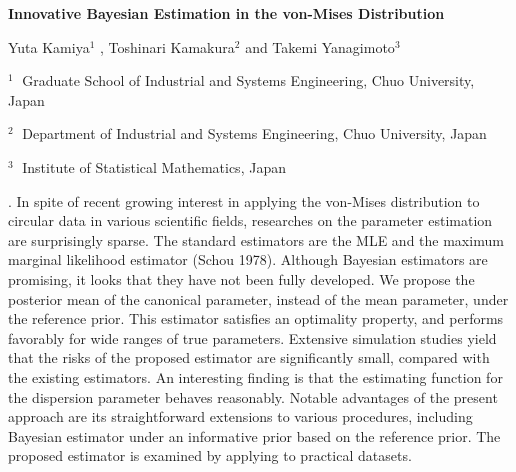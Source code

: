 \documentclass[12pt]{article}
\begin{document}
\begin{flushleft}


{\LARGE\bf Innovative Bayesian Estimation in the von-Mises Distribution}


\vspace{1.0cm}

Yuta Kamiya$^1$ , Toshinari Kamakura$^2$ and Takemi Yanagimoto$^3$

\begin{description}

\item $^1 \;$ Graduate School of Industrial and  Systems Engineering, Chuo University,
Japan
\vspace{-3mm}
\item $^2 \;$ Department of Industrial  and Systems Engineering, Chuo University, Japan
\vspace{-3mm}
\item $^3 \;$ Institute of Statistical Mathematics, Japan

\end{description}

\end{flushleft}


\vspace{0.75cm}

. In spite of recent growing interest in applying the von-Mises distribution to circular data in various scientific fields, researches on the parameter estimation are surprisingly sparse.
 The standard estimators are the MLE and the maximum marginal likelihood estimator (Schou 1978).
 Although Bayesian estimators are promising, it looks that they have not been fully developed.
 We propose the posterior mean of the canonical parameter, instead of the mean parameter, under the reference prior.
 This estimator satisfies an optimality property, and performs favorably for wide ranges of true parameters.
 Extensive simulation studies yield that the risks of the proposed estimator are significantly small, compared with the existing estimators.
 An interesting finding is that the estimating function for the dispersion parameter behaves reasonably.
 Notable advantages of the present approach are its straightforward extensions to various procedures, including Bayesian estimator under an informative prior based on the reference prior.
 The proposed estimator is examined by applying to practical datasets.
\end{document}
